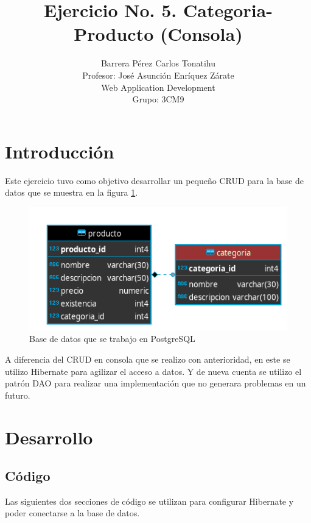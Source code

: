 \documentclass[a4paper,12pt]{article}
\title{Ejercicio No. 5. Categoria-Producto (Consola)}
\author{Barrera Pérez Carlos Tonatihu \\ Profesor: José Asunción Enríquez 
Zárate \\ Web Application Development \\ Grupo: 3CM9 }
\begin{document}
\maketitle

\newpage
\tableofcontents
\newpage
\section{Introducción}
Este ejercicio tuvo como objetivo desarrollar un pequeño CRUD para la base de 
datos que se muestra en la figura \ref{fig:bd}.

\begin{figure}[H]
\begin{center}
 \includegraphics[width=\textwidth]{bd.png}
 \caption{Base de datos que se trabajo en PostgreSQL}
 \label{fig:bd}
\end{center}
\end{figure}

A diferencia del CRUD en consola que se realizo con anterioridad, en este se 
utilizo Hibernate para agilizar el acceso a datos. Y de nueva cuenta se utilizo 
el patrón DAO para realizar una implementación que no generara problemas en un 
futuro. 

\section{Desarrollo}

\subsection{Código}
Las siguientes dos secciones de código se utilizan para configurar Hibernate y 
poder conectarse a la base de datos.
\end{document}
